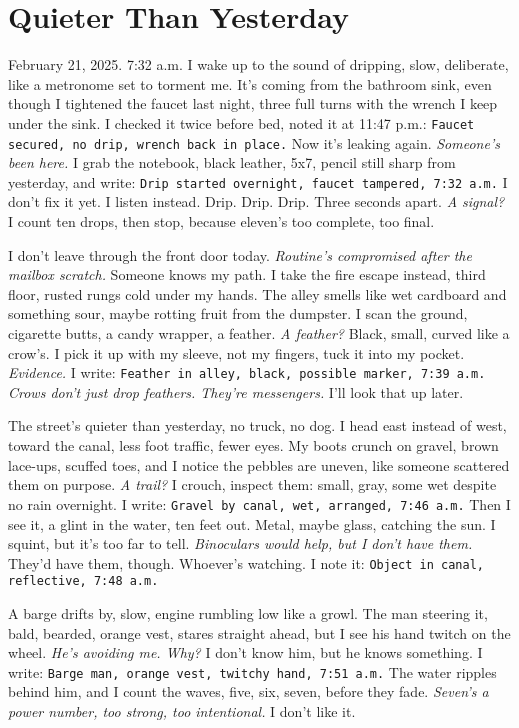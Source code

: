 \documentclass[12pt]{article}
\newcommand{\note}[1]{\texttt{#1}}
\begin{document}
\section{Quieter Than Yesterday}

February 21, 2025. 7:32 a.m. I wake up to the sound of dripping, slow, deliberate, like a metronome set to torment me. It’s coming from the bathroom sink, even though I tightened the faucet last night, three full turns with the wrench I keep under the sink. I checked it twice before bed, noted it at 11:47 p.m.: \note{Faucet secured, no drip, wrench back in place.} Now it’s leaking again. \textit{Someone’s been here.} I grab the notebook, black leather, 5x7, pencil still sharp from yesterday, and write: \note{Drip started overnight, faucet tampered, 7:32 a.m.} I don’t fix it yet. I listen instead. Drip. Drip. Drip. Three seconds apart. \textit{A signal?} I count ten drops, then stop, because eleven’s too complete, too final.

I don’t leave through the front door today. \textit{Routine’s compromised after the mailbox scratch.} Someone knows my path. I take the fire escape instead, third floor, rusted rungs cold under my hands. The alley smells like wet cardboard and something sour, maybe rotting fruit from the dumpster. I scan the ground, cigarette butts, a candy wrapper, a feather. \textit{A feather?} Black, small, curved like a crow’s. I pick it up with my sleeve, not my fingers, tuck it into my pocket. \textit{Evidence.} I write: \note{Feather in alley, black, possible marker, 7:39 a.m.} \textit{Crows don’t just drop feathers. They’re messengers.} I’ll look that up later.

The street’s quieter than yesterday, no truck, no dog. I head east instead of west, toward the canal, less foot traffic, fewer eyes. My boots crunch on gravel, brown lace-ups, scuffed toes, and I notice the pebbles are uneven, like someone scattered them on purpose. \textit{A trail?} I crouch, inspect them: small, gray, some wet despite no rain overnight. I write: \note{Gravel by canal, wet, arranged, 7:46 a.m.} Then I see it, a glint in the water, ten feet out. Metal, maybe glass, catching the sun. I squint, but it’s too far to tell. \textit{Binoculars would help, but I don’t have them.} They’d have them, though. Whoever’s watching. I note it: \note{Object in canal, reflective, 7:48 a.m.}

A barge drifts by, slow, engine rumbling low like a growl. The man steering it, bald, bearded, orange vest, stares straight ahead, but I see his hand twitch on the wheel. \textit{He’s avoiding me. Why?} I don’t know him, but he knows something. I write: \note{Barge man, orange vest, twitchy hand, 7:51 a.m.} The water ripples behind him, and I count the waves, five, six, seven, before they fade. \textit{Seven’s a power number, too strong, too intentional.} I don’t like it.
\end{document}
